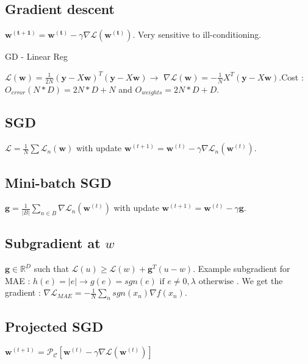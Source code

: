 \subsection{Gradient descent}

$\mathbf{w^{(t+1)}} = \mathbf{w^{(t)}} - \gamma \nabla \mathcal{L}(\mathbf{w^{(t)}})$. Very sensitive to ill-conditioning.

GD - Linear Reg

$\mathcal{L}(\mathbf{w}) = \frac{1}{2N} (\mathbf{y} - X\mathbf{w})^T(\mathbf{y} - X\mathbf{w}) \rightarrow$ \newline $ \nabla \mathcal{L}(\mathbf{w}) = - \frac{1}{N} X^T(\mathbf{y} - X\mathbf{w})$.\newline Cost : $O_{error}(N*D) = 2N*D + N$ and $O_{weights} = 2N*D + D$.

\subsection{SGD} 

$\mathcal{L} = \frac{1}{N} \sum{\mathcal{L}}_n(\mathbf{w})$ with update $\mathbf{w}^{(t+1)} = \mathbf{w}^{(t)} - \gamma \nabla \mathcal{L}_n(\mathbf{w}^{(t)})$.

\subsection{Mini-batch SGD}

$\mathbf{g} = \frac{1}{|B|} \sum_{n\in B}{\nabla \mathcal{L}}_n(\mathbf{w}^{(t)})$ with update $\mathbf{w}^{(t+1)} = \mathbf{w}^{(t)} - \gamma \mathbf{g}$.

\subsection{Subgradient at $w$}

$\mathbf{g} \in \mathbb{R}^D$ such that $\mathcal{L}(u) \ge \mathcal{L}(w) + \mathbf{g}^T (u-w)$. Example subgradient for MAE : $h(e) = |e| \rightarrow g(e) = {sgn(e) \text{ if } e \ne 0, \lambda \text{ otherwise }}$. We get the gradient : $\nabla \mathcal{L}_{MAE} = - \frac{1}{N} \sum_n sgn(x_n) \nabla f(x_n)$.

\subsection{Projected SGD}

$\mathbf{w}^{(t+1)} = \mathcal{P_C} [\mathbf{w}^{(t)} - \gamma \nabla \mathcal{L}(\mathbf{w}^{(t)})]$

